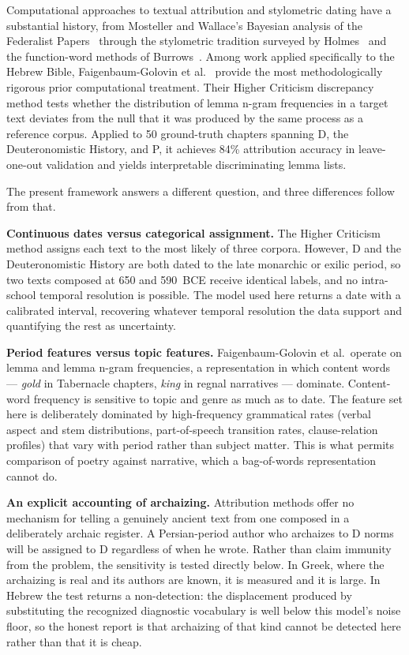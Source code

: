 \documentclass[10pt,letterpaper]{article}
\begin{document}
Computational approaches to textual attribution and stylometric dating have a
substantial history, from Mosteller and Wallace's Bayesian analysis of the
Federalist Papers~\cite{Mosteller1984} through the stylometric tradition
surveyed by Holmes~\cite{Holmes1998} and the function-word methods of
Burrows~\cite{Burrows2002}.  Among work applied specifically to the Hebrew
Bible, Faigenbaum-Golovin et al.~\cite{Faigenbaum2025} provide the most
methodologically rigorous prior computational treatment.  Their Higher
Criticism discrepancy method tests whether the distribution of lemma n-gram
frequencies in a target text deviates from the null that it was produced by
the same process as a reference corpus.  Applied to 50 ground-truth chapters
spanning D, the Deuteronomistic History, and P, it achieves 84\% attribution
accuracy in leave-one-out validation and yields interpretable discriminating
lemma lists.

The present framework answers a different question, and three differences
follow from that.

\textbf{Continuous dates versus categorical assignment.}  The Higher Criticism
method assigns each text to the most likely of three corpora.  However, D and
the Deuteronomistic History are both dated to the late monarchic or exilic
period, so two texts composed at 650 and 590~BCE receive identical labels, and
no intra-school temporal resolution is possible.  The model used here returns a
date with a calibrated interval, recovering whatever temporal resolution the
data support and quantifying the rest as uncertainty.

\textbf{Period features versus topic features.}  Faigenbaum-Golovin et al.\
operate on lemma and lemma n-gram frequencies, a representation in which
content words --- \textit{gold} in Tabernacle chapters, \textit{king} in
regnal narratives --- dominate.  Content-word frequency is sensitive to topic
and genre as much as to date.  The feature set here is deliberately dominated
by high-frequency grammatical rates (verbal aspect and stem distributions,
part-of-speech transition rates, clause-relation profiles) that vary with
period rather than subject matter.  This is what permits comparison of poetry
against narrative, which a bag-of-words representation cannot do.

\textbf{An explicit accounting of archaizing.}  Attribution methods offer no
mechanism for telling a genuinely ancient text from one composed in a
deliberately archaic register.  A Persian-period author who archaizes to D
norms will be assigned to D regardless of when he wrote.  Rather than claim
immunity from the problem, the sensitivity is tested directly below.  In Greek,
where the archaizing is real and its authors are known, it is measured and it is
large.  In Hebrew the test returns a non-detection: the displacement produced by
substituting the recognized diagnostic vocabulary is well below this model's
noise floor, so the honest report is that archaizing of that kind cannot be
detected here rather than that it is cheap.
\end{document}
